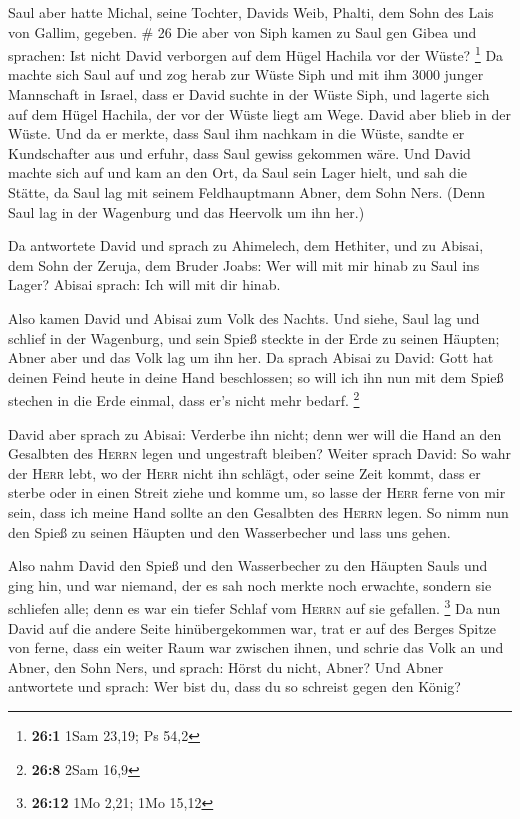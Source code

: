  Saul aber hatte Michal, seine Tochter, Davids Weib,
Phalti, dem Sohn des Lais von Gallim, gegeben. \# 26  Die
aber von Siph kamen zu Saul gen Gibea und sprachen: Ist nicht David
verborgen auf dem Hügel Hachila vor der Wüste? \footnote{\textbf{26:1}
  1Sam 23,19; Ps 54,2}  Da machte sich Saul auf und zog
herab zur Wüste Siph und mit ihm 3000 junger Mannschaft in Israel, dass
er David suchte in der Wüste Siph,  und lagerte sich auf
dem Hügel Hachila, der vor der Wüste liegt am Wege. David aber blieb in
der Wüste. Und da er merkte, dass Saul ihm nachkam in die Wüste,
 sandte er Kundschafter aus und erfuhr, dass Saul gewiss
gekommen wäre.  Und David machte sich auf und kam an den
Ort, da Saul sein Lager hielt, und sah die Stätte, da Saul lag mit
seinem Feldhauptmann Abner, dem Sohn Ners. (Denn Saul lag in der
Wagenburg und das Heervolk um ihn her.)

 Da antwortete David und sprach zu Ahimelech, dem
Hethiter, und zu Abisai, dem Sohn der Zeruja, dem Bruder Joabs: Wer will
mit mir hinab zu Saul ins Lager? Abisai sprach: Ich will mit dir hinab.

 Also kamen David und Abisai zum Volk des Nachts. Und
siehe, Saul lag und schlief in der Wagenburg, und sein Spieß steckte in
der Erde zu seinen Häupten; Abner aber und das Volk lag um ihn her.
 Da sprach Abisai zu David: Gott hat deinen Feind heute in
deine Hand beschlossen; so will ich ihn nun mit dem Spieß stechen in die
Erde einmal, dass er's nicht mehr bedarf. \footnote{\textbf{26:8} 2Sam
  16,9}

 David aber sprach zu Abisai: Verderbe ihn nicht; denn wer
will die Hand an den Gesalbten des \textsc{Herrn} legen und ungestraft
bleiben?  Weiter sprach David: So wahr der \textsc{Herr}
lebt, wo der \textsc{Herr} nicht ihn schlägt, oder seine Zeit kommt,
dass er sterbe oder in einen Streit ziehe und komme um, 
so lasse der \textsc{Herr} ferne von mir sein, dass ich meine Hand
sollte an den Gesalbten des \textsc{Herrn} legen. So nimm nun den Spieß
zu seinen Häupten und den Wasserbecher und lass uns gehen.

 Also nahm David den Spieß und den Wasserbecher zu den
Häupten Sauls und ging hin, und war niemand, der es sah noch merkte noch
erwachte, sondern sie schliefen alle; denn es war ein tiefer Schlaf vom
\textsc{Herrn} auf sie gefallen. \footnote{\textbf{26:12} 1Mo 2,21; 1Mo
  15,12}  Da nun David auf die andere Seite
hinübergekommen war, trat er auf des Berges Spitze von ferne, dass ein
weiter Raum war zwischen ihnen,  und schrie das Volk an
und Abner, den Sohn Ners, und sprach: Hörst du nicht, Abner? Und Abner
antwortete und sprach: Wer bist du, dass du so schreist gegen den König?

